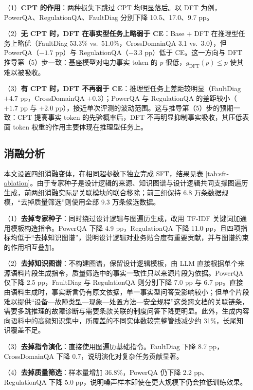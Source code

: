 \documentclass[fontset=fandol,type=master,campus=shenzhen,etitleauto=true]{hithesisbook}
\begin{document}
（1）\textbf{CPT 的作用}：两种损失下跳过 CPT 均明显落后。以 DFT 为例，PowerQA、RegulationQA、FaultDiag 分别下降 10.5、17.0、9.7 pp。

（2）\textbf{无 CPT 时，DFT 在事实型任务上略弱于 CE}：Base + DFT 在推理型任务上略优（FaultDiag 53.3\% vs.\ 51.0\%，CrossDomainQA 3.1 vs.\ 3.0），但 PowerQA（$-1.7$ pp）与 RegulationQA（$-3.3$ pp）低于 CE。这一方向与 DFT 推导第（5）步一致：基座模型对电力事实 token 的 $p$ 很低，$g_{\text{DFT}}(p) \le p$ 使其难以被吸收。

（3）\textbf{有 CPT 时，DFT 不再弱于 CE}：推理型任务上差距较明显（FaultDiag $+4.7$ pp，CrossDomainQA $+0.3$）；PowerQA 与 RegulationQA 的差距较小（$+1.7$ pp 与 $+2.0$ pp），接近单次评测的波动范围。这与推导第（5）步的预期一致：CPT 提高事实 token 的先验概率后，DFT 不再明显抑制事实吸收，其压低表面 token 权重的作用主要体现在推理型任务上。

\subsection{消融分析}\label{ux6d88ux878dux5206ux6790}

本文设置四组消融变体，在相同超参数下独立完成 SFT，结果见表 \ref{tab:sft-ablation}。由于专家种子是设计逻辑的来源、知识图谱与设计逻辑共同支撑图遍历生成，前两组消融实际是关联模块的联合移除；前三组保持 6.8 万条数据规模，“去掉质量筛选”则使用全部 9.3 万条候选数据。

（1）\textbf{去掉专家种子}：同时绕过设计逻辑与图遍历生成，改用 TF-IDF 关键词加通用模板构造指令。PowerQA 下降 4.9 pp，RegulationQA 下降 11.0 pp，且四项指标均低于“去掉知识图谱”，说明设计逻辑对业务贴合度有重要贡献，并与图谱约束的作用相互叠加。

（2）\textbf{去掉知识图谱}：不构建图谱，保留设计逻辑模板，由 LLM 直接根据单个来源语料片段生成指令，质量筛选中的事实一致性只以来源片段为依据。PowerQA 仅下降 2.5 pp，FaultDiag 与 RegulationQA 则分别下降 7.0 pp 与 6.7 pp。直接由语料生成时，事实断言仍有原文依据，单一事实型问答受影响较小；但单个片段难以提供“设备—故障类型—现象—处置方法—安全规程”这类跨文档的关联链条，需要多跳推理的故障诊断与需要条款关联的制度问答下降更明显。此外，生成内容向语料中的高频知识集中，所覆盖的不同实体数较完整管线减少约 31\%，长尾知识覆盖不足。

（3）\textbf{去掉指令演化}：直接使用图遍历基础指令。FaultDiag 下降 8.7 pp，CrossDomainQA 下降 0.7，说明演化对复杂任务贡献显著。

（4）\textbf{去掉质量筛选}：样本量增加 36.8\%，PowerQA 仍下降 2.2 pp、RegulationQA 下降 5.0 pp，说明噪声样本即使在更大规模下仍会拉低训练效果。
\end{document}
